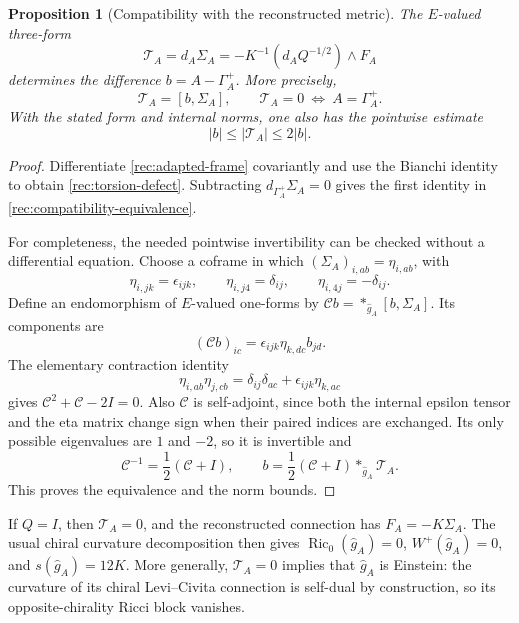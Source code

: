\documentclass[11pt]{article}
\numberwithin{equation}{section}
\newtheorem{proposition}[theorem]{Proposition}
\theoremstyle{definition}
\theoremstyle{remark}
\DeclareMathOperator{\Ric}{Ric}
\begin{document}
\begin{proposition}[Compatibility with the reconstructed metric]
\label{rec:compatibility}
The $E$-valued three-form
\begin{equation}
 \mathcal T_A=d_A\Sigma_A
   =-K^{-1}(d_AQ^{-1/2})\wedge F_A
 \label{rec:torsion-defect}
\end{equation}
determines the difference $b=A-\Gamma_A^+$.  More precisely,
\begin{equation}
 \mathcal T_A=[b,\Sigma_A],
 \qquad \mathcal T_A=0\ \Longleftrightarrow\ A=\Gamma_A^+.
 \label{rec:compatibility-equivalence}
\end{equation}
With the stated form and internal norms, one also has the pointwise
estimate
\begin{equation}
 |b|\leq |\mathcal T_A|\leq2|b|.
 \label{rec:compatibility-norm}
\end{equation}
\end{proposition}

\begin{proof}
Differentiate \eqref{rec:adapted-frame} covariantly and use the Bianchi
identity to obtain \eqref{rec:torsion-defect}.  Subtracting
$d_{\Gamma_A^+}\Sigma_A=0$ gives the first identity in
\eqref{rec:compatibility-equivalence}.

For completeness, the needed pointwise invertibility can be checked
without a differential equation.  Choose a coframe in which
$(\Sigma_A)_{i,ab}=\eta_{i,ab}$, with
\[
 \eta_{i,jk}=\epsilon_{ijk},\qquad
 \eta_{i,j4}=\delta_{ij},\qquad
 \eta_{i,4j}=-\delta_{ij}.
\]
Define an endomorphism of $E$-valued one-forms by
$\mathscr Cb=*_{\widehat g_A}[b,\Sigma_A]$.  Its components are
\[
 (\mathscr Cb)_{ic}
       =\epsilon_{ijk}\eta_{k,dc}b_{jd}.
\]
The elementary contraction identity
\[
 \eta_{i,ab}\eta_{j,cb}
       =\delta_{ij}\delta_{ac}+\epsilon_{ijk}\eta_{k,ac}
\]
gives $\mathscr C^2+\mathscr C-2I=0$.  Also $\mathscr C$ is
self-adjoint, since both the internal epsilon tensor and the eta
matrix change sign when their paired indices are exchanged.
Its only possible eigenvalues are $1$ and $-2$, so it is invertible and
\[
 \mathscr C^{-1}=\frac12(\mathscr C+I),\qquad
 b=\frac12(\mathscr C+I)*_{\widehat g_A}\mathcal T_A.
\]
This proves the equivalence and the norm bounds.
\end{proof}

If $Q=I$, then $\mathcal T_A=0$, and the reconstructed connection has
$F_A=-K\Sigma_A$.  The usual chiral curvature decomposition then gives
$\Ric_0(\widehat g_A)=0$, $W^+(\widehat g_A)=0$, and
$s(\widehat g_A)=12K$.  More generally, $\mathcal T_A=0$ implies that
$\widehat g_A$ is Einstein: the curvature of its chiral Levi--Civita
connection is self-dual by construction, so its opposite-chirality
Ricci block vanishes.
\end{document}
